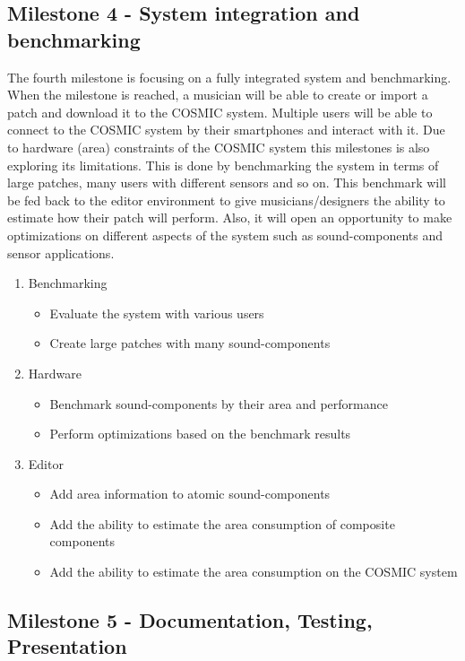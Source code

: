 \subsection{Milestone 4 - System integration and benchmarking}

The fourth milestone is focusing on a fully integrated system and benchmarking.
When the milestone is reached, a musician will be able to create or import a patch and download it to the \ac{COSMIC} system. 
Multiple users will be able to connect to the \ac{COSMIC} system by their smartphones and interact with it. 
Due to hardware (area) constraints of the \ac{COSMIC} system this milestones is also exploring its limitations. 
This is done by benchmarking the system in terms of large patches, many users with different sensors and so on. 
This benchmark will be fed back to the editor environment to give musicians/designers the ability to estimate how their patch will perform. 
Also, it will open an opportunity to make optimizations on different aspects of the system such as sound-components and sensor applications.

	\begin{enumerate}
		\item Benchmarking
			\begin{itemize}
				\item Evaluate the system with various users
				\item Create large patches with many sound-components
			\end{itemize}
		\item Hardware
			\begin{itemize}
				\item Benchmark sound-components by their area and performance
				\item Perform optimizations based on the benchmark results
			\end{itemize}
		\item Editor
			\begin{itemize}
				\item Add area information to atomic sound-components
				\item Add the ability to estimate the area consumption of composite components
				\item Add the ability to estimate the area consumption on the \ac{COSMIC} system
			\end{itemize}
	\end{enumerate}

\subsection{Milestone 5 - Documentation, Testing, Presentation}

